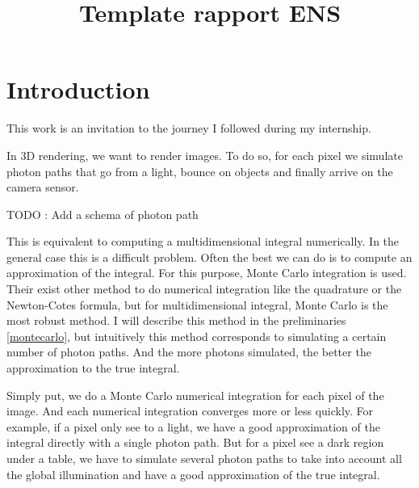 \documentclass{classeENS}
\title{Template rapport ENS} %
\begin{document}

\matiere{} 
\motif{}

\tuteurpcp{}

        
\fairemarges %


\tabledematieres %

\section{Introduction}

This work is an invitation to the journey I followed during my internship. 

\par In 3D rendering, we want to render images. To do so, for each pixel 
we simulate photon paths that go from a light, bounce on objects and finally 
arrive on the camera sensor.

{\color{red} TODO : Add a schema of photon path}

\par This is equivalent to computing a multidimensional integral numerically. 
In the general case this is a difficult problem. Often the best we can do is 
to compute an approximation of the integral. For this purpose, Monte Carlo integration 
is used. Their exist other method to do numerical integration like the quadrature or 
the Newton-Cotes formula, but for multidimensional integral, Monte Carlo is the
most robust method.
I will describe this method in the preliminaries \ref{montecarlo}, 
but intuitively this method corresponds to simulating a certain 
number of photon paths. And the more photons simulated, the better 
the approximation to the true integral.

\par Simply put, we do a Monte Carlo numerical integration for each pixel 
of the image. And each numerical integration converges more or less quickly. 
For example, if a pixel only see to a light, we have a good approximation 
of the integral directly with a single photon path. But for a pixel see a dark 
region under a table, we have to simulate several photon paths to take into account
all the global illumination and have a good approximation of the true integral.
\end{document}
